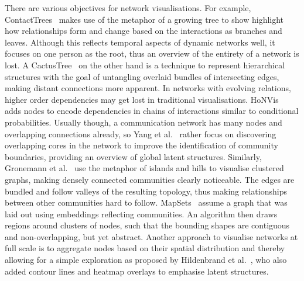 There are various objectives for network visualisations.
For example, ContactTrees~\cite{sallaberry2016contact} makes use of the metaphor of a growing tree to show highlight how relationships form and change based on the interactions as branches and leaves.
Although this reflects temporal aspects of dynamic networks well, it focuses on one person as the root, thus an overview of the entirety of a network is lost.
A CactusTree~\cite{dang2017cactustree} on the other hand is a technique to represent hierarchical structures with the goal of untangling overlaid bundles of intersecting edges, making distant connections more apparent.
In networks with evolving relations, higher order dependencies may get lost in traditional visualisations.
HoNVis~\cite{tao2017honvis} adds nodes to encode dependencies in chains of interactions similar to conditional probabilities.
Usually though, a communication network has many nodes and overlapping connections already, so Yang et al.~\cite{yang2014overlapping} rather focus on discovering overlapping cores in the network to improve the identification of community boundaries, providing an overview of global latent structures.
Similarly, Gronemann et al.~\cite{gronemann2012drawing} use the metaphor of islands and hills to visualise clustered graphs, making densely connected communities clearly noticeable.
The edges are bundled and follow valleys of the resulting topology, thus making relationships between other communities hard to follow.
MapSets~\cite{efrat2015mapsets} assume a graph that was laid out using embeddings reflecting communities.
An algorithm then draws regions around clusters of nodes, such that the bounding shapes are contiguous and non-overlapping, but yet abstract.
Another approach to visualise networks at full scale is to aggregate nodes based on their spatial distribution and thereby allowing for a simple exploration as proposed by Hildenbrand et al.~\cite{hildenbrand2016flexible}, who also added contour lines and heatmap overlays to emphasise latent structures.

%
%

